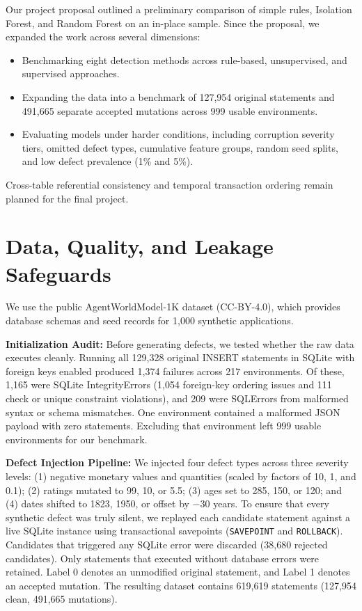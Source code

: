 \documentclass[conference]{IEEEtran}
\begin{document}
Our project proposal outlined a preliminary comparison of simple rules, Isolation Forest, and Random Forest on an in-place sample. Since the proposal, we expanded the work across several dimensions:
\begin{itemize}
    \item Benchmarking eight detection methods across rule-based, unsupervised, and supervised approaches.
    \item Expanding the data into a benchmark of 127,954 original statements and 491,665 separate accepted mutations across 999 usable environments.
    \item Evaluating models under harder conditions, including corruption severity tiers, omitted defect types, cumulative feature groups, random seed splits, and low defect prevalence (1\% and 5\%).
\end{itemize}
Cross-table referential consistency and temporal transaction ordering remain planned for the final project.

\section{Data, Quality, and Leakage Safeguards}
We use the public AgentWorldModel-1K dataset \cite{snowflake2026awm} (CC-BY-4.0), which provides database schemas and seed records for 1,000 synthetic applications.

\textbf{Initialization Audit:} Before generating defects, we tested whether the raw data executes cleanly. Running all 129,328 original INSERT statements in SQLite with foreign keys enabled produced 1,374 failures across 217 environments. Of these, 1,165 were SQLite IntegrityErrors (1,054 foreign-key ordering issues and 111 check or unique constraint violations), and 209 were SQLErrors from malformed syntax or schema mismatches. One environment contained a malformed JSON payload with zero statements. Excluding that environment left 999 usable environments for our benchmark.

\textbf{Defect Injection Pipeline:} We injected four defect types across three severity levels: (1) negative monetary values and quantities (scaled by factors of 10, 1, and 0.1); (2) ratings mutated to 99, 10, or 5.5; (3) ages set to 285, 150, or 120; and (4) dates shifted to 1823, 1950, or offset by $-30$ years. To ensure that every synthetic defect was truly silent, we replayed each candidate statement against a live SQLite instance using transactional savepoints (\texttt{SAVEPOINT} and \texttt{ROLLBACK}). Candidates that triggered any SQLite error were discarded (38,680 rejected candidates). Only statements that executed without database errors were retained. Label 0 denotes an unmodified original statement, and Label 1 denotes an accepted mutation. The resulting dataset contains 619,619 statements (127,954 clean, 491,665 mutations).
\end{document}
